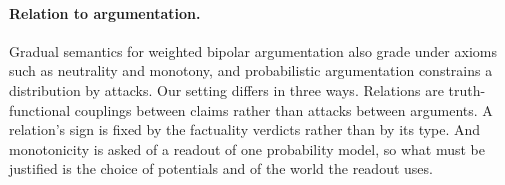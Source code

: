 \paragraph{Relation to argumentation.} Gradual semantics for weighted bipolar argumentation
\citep{cayrol2005,amgoud2016,amgoud2018,baroni2019} also grade under axioms such as neutrality and
monotony, and probabilistic argumentation \citep{thimm2012,hunter2013} constrains a distribution by
attacks. Our setting differs in three ways. Relations are truth-functional couplings between claims
rather than attacks between arguments. A relation's sign is fixed by the factuality verdicts rather
than by its type. And monotonicity is asked of a readout of one probability model, so what must be
justified is the choice of potentials and of the world the readout uses.
